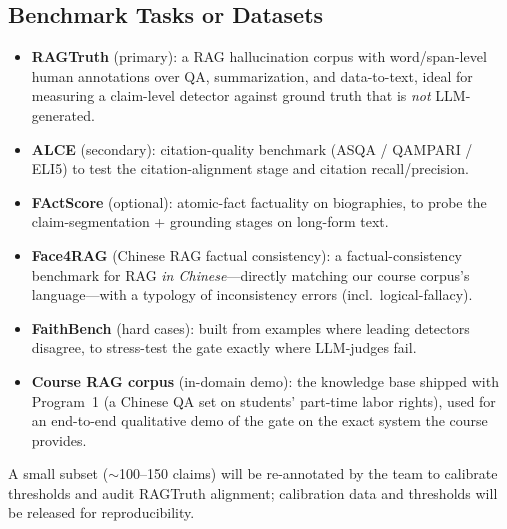\subsection{Benchmark Tasks or Datasets}
\begin{itemize}
  \item \textbf{RAGTruth} \citep{niu2024ragtruth} (primary): a RAG hallucination corpus
  with word/span-level human annotations over QA, summarization, and data-to-text,
  ideal for measuring a claim-level detector against ground truth that is \emph{not}
  LLM-generated.
  \item \textbf{ALCE} \citep{gao2023alce} (secondary): citation-quality benchmark
  (ASQA / QAMPARI / ELI5) to test the citation-alignment stage and citation
  recall/precision.
  \item \textbf{FActScore} \citep{min2023factscore} (optional): atomic-fact factuality on
  biographies, to probe the claim-segmentation + grounding stages on long-form text.
  \item \textbf{Face4RAG} \citep{xu2024face4rag} (Chinese RAG factual consistency): a
  factual-consistency benchmark for RAG \emph{in Chinese}---directly matching our course
  corpus's language---with a typology of inconsistency errors (incl.\ logical-fallacy).
  \item \textbf{FaithBench} \citep{bao2025faithbench} (hard cases): built from examples
  where leading detectors disagree, to stress-test the gate exactly where LLM-judges fail.
  \item \textbf{Course RAG corpus} (in-domain demo): the knowledge base shipped with
  Program~1 (a Chinese QA set on students' part-time labor rights), used for an end-to-end
  qualitative demo of the gate on the exact system the course provides.
\end{itemize}
A small subset ($\sim$100--150 claims) will be re-annotated by the team to calibrate
thresholds and audit RAGTruth alignment; calibration data and thresholds will be released
for reproducibility.
